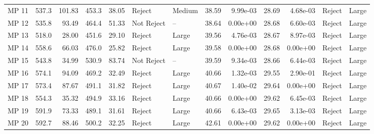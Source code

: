 \begin{tabular}{lrrrrllrrrrll}
 MP 11 &              537.3 &  101.83 &               453.3 &  38.05 &      Reject &      Medium &                    38.59 &  9.99e-03 &                     28.69 &  4.68e-03 &  Reject &       Large \\
 MP 12 &              535.8 &   93.49 &               464.4 &  51.33 &  Not Reject &          -- &                    38.64 &  0.00e+00 &                     28.68 &  6.60e-03 &  Reject &       Large \\
 MP 13 &              518.0 &   28.00 &               451.6 &  29.10 &      Reject &       Large &                    39.56 &  4.76e-03 &                     28.67 &  8.97e-03 &  Reject &       Large \\
 MP 14 &              558.6 &   66.03 &               476.0 &  25.82 &      Reject &       Large &                    39.58 &  0.00e+00 &                     28.68 &  0.00e+00 &  Reject &       Large \\
 MP 15 &              543.8 &   34.99 &               530.9 &  83.74 &  Not Reject &          -- &                    39.59 &  9.34e-03 &                     28.66 &  6.44e-03 &  Reject &       Large \\
 MP 16 &              574.1 &   94.09 &               469.2 &  32.49 &      Reject &       Large &                    40.66 &  1.32e-03 &                     29.55 &  2.90e-01 &  Reject &       Large \\
 MP 17 &              573.4 &   87.67 &               491.1 &  31.82 &      Reject &       Large &                    40.67 &  1.40e-02 &                     29.64 &  0.00e+00 &  Reject &       Large \\
 MP 18 &              554.3 &   35.32 &               494.9 &  33.16 &      Reject &       Large &                    40.66 &  0.00e+00 &                     29.62 &  6.45e-03 &  Reject &       Large \\
 MP 19 &              591.9 &   73.33 &               489.1 &  31.61 &      Reject &       Large &                    40.66 &  6.43e-03 &                     29.65 &  3.13e-03 &  Reject &       Large \\
 MP 20 &              592.7 &   88.46 &               500.2 &  32.25 &      Reject &       Large &                    42.61 &  0.00e+00 &                     29.62 &  0.00e+00 &  Reject &       Large \\
\bottomrule
\end{tabular}
